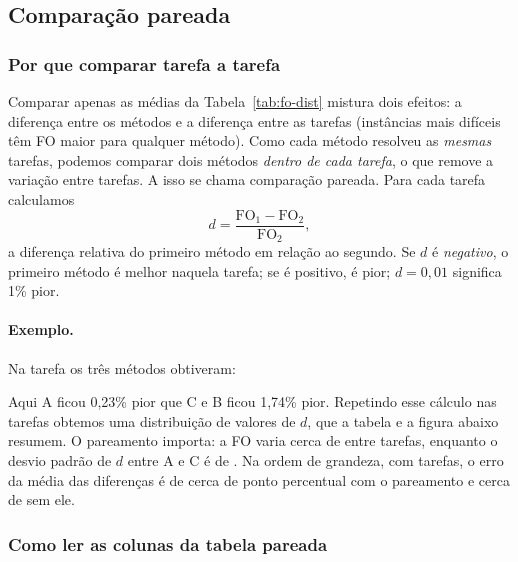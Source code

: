 \documentclass[11pt,a4paper]{article}
\newcommand{\FO}{\mathrm{FO}}
\begin{document}
\subsection{Comparação pareada}

\subsubsection*{Por que comparar tarefa a tarefa}

Comparar apenas as médias da Tabela~\ref{tab:fo-dist} mistura dois efeitos: a
diferença entre os métodos e a diferença entre as tarefas (instâncias mais difíceis
têm FO maior para qualquer método). Como cada método resolveu as \emph{mesmas}
tarefas, podemos comparar dois métodos \emph{dentro de cada tarefa}, o que remove
a variação entre tarefas. A isso se chama comparação pareada. Para cada tarefa
calculamos
\[
  d = \frac{\FO_{1} - \FO_{2}}{\FO_{2}},
\]
a diferença relativa do primeiro método em relação ao segundo. Se $d$ é
\emph{negativo}, o primeiro método é melhor naquela tarefa; se é positivo, é
pior; $d = 0{,}01$ significa 1\% pior.

\paragraph{Exemplo.} Na tarefa  os três métodos obtiveram:

\begin{table}[H]
  \centering
  \small
  
  \caption{Exemplo de uma tarefa. A coluna da direita é $d$ em relação ao método C.}
  \label{tab:exemplo}
\end{table}

Aqui A ficou 0,23\% pior que C e B ficou 1,74\% pior. Repetindo esse cálculo nas
\nPaired{} tarefas obtemos uma distribuição de valores de $d$, que a tabela e a
figura abaixo resumem. O pareamento importa: a FO varia cerca de \cvFOA{} entre tarefas,
enquanto o desvio padrão de $d$ entre A e C é de \sdDiffAC{}. Na ordem de grandeza, com
\nPaired{} tarefas, o erro da média das diferenças é de cerca de \sePaired{} ponto percentual
com o pareamento e cerca de \seUnpaired{} sem ele.

\subsubsection*{Como ler as colunas da tabela pareada}
\end{document}
